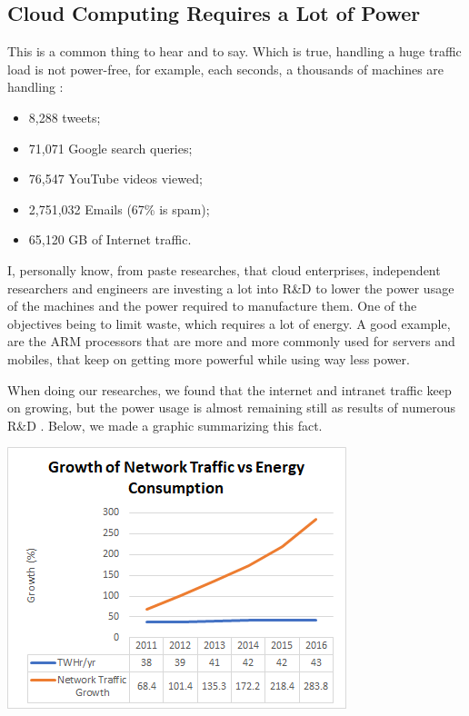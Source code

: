 \documentclass[final, a4paper, 9.5pt]{article}
\newenvironment{Figure}
  {\par\medskip\noindent\minipage{\linewidth}}
  {\endminipage\par\medskip}
\begin{document}
\begin{multicols}{2}

\section*{Cloud Computing Requires a Lot of Power}
This is a common thing to hear and to say. Which is true, handling a huge traffic load is not power-free, for example, each seconds, a thousands of machines are handling \cite{google_searches}:
\begin{itemize}
    \item 8,288 tweets;
    \item 71,071 Google search queries;
    \item 76,547 YouTube videos viewed;
    \item 2,751,032 Emails (67\% is spam);
    \item 65,120 GB of Internet traffic.
\end{itemize}

I, personally know, from paste researches, that cloud enterprises, independent researchers and engineers are investing a lot into R\&D to lower the power usage of the machines and the power required to manufacture them. One of the objectives being to limit waste, which requires a lot of energy. A good example, are the ARM processors that are more and more commonly used for servers and mobiles, that keep on getting more powerful while using way less power.

When doing our researches, we found that the internet and intranet traffic keep on growing, but the power usage is almost remaining still as results of numerous R\&D \cite{traffic_growth}. Below, we made a graphic summarizing this fact.
\begin{Figure}
    \centering
    \includegraphics[width=\linewidth]{figures/cloudgrowth.png}
\end{Figure}


\end{multicols}
\end{document}
